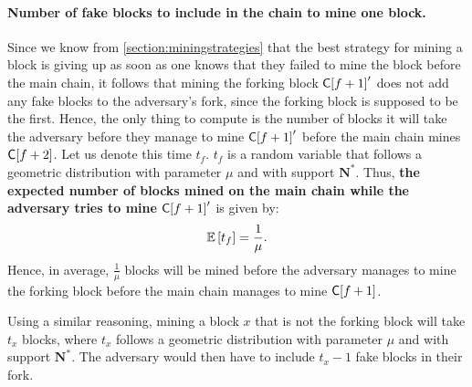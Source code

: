 \paragraph{Number of fake blocks to include in the chain to mine one block.} Since we know from \autoref{section:miningstrategies} that the best strategy for mining a block is giving up as soon as one knows that they failed to mine the block before the main chain, it follows that mining the forking block \(\mathsf{C[}f+1\mathsf{]}'\) does not add any fake blocks to the adversary's fork, since the forking block is supposed to be the first. Hence, the only thing to compute is the number of blocks it will take the adversary before they manage to mine \(\mathsf{C[}f+1\mathsf{]}'\) before the main chain mines \(\mathsf{C[}f+2\mathsf{]}\). Let us denote this time \(t_f\). \(t_f\) is a random variable that follows a geometric distribution with parameter \(\mu\) and with support \(\mathbf{N}^*\). Thus, \textbf{the expected number of blocks mined on the main chain while the adversary tries to mine \(\mathsf{C[}f+1\mathsf{]}'\)} is given by:
\[\mathbb{E}\left[t_f\right]=\frac{1}{\mu}.\]
Hence, in average, \(\frac{1}{\mu}\) blocks will be mined before the adversary manages to mine the forking block before the main chain manages to mine \(\mathsf{C[}f+1\mathsf{]}\).

Using a similar reasoning, mining a block \(x\) that is not the forking block will take \(t_x\) blocks, where \(t_x\) follows a geometric distribution with parameter \(\mu\) and with support \(\mathbf{N}^*\). The adversary would then have to include \(t_x-1\) fake blocks in their fork.

